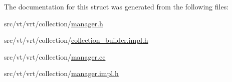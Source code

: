 The documentation for this struct was generated from the following files\+:\begin{DoxyCompactItemize}
\item 
src/vt/vrt/collection/\hyperlink{vrt_2collection_2manager_8h}{manager.\+h}\item 
src/vt/vrt/collection/\hyperlink{collection__builder_8impl_8h}{collection\+\_\+builder.\+impl.\+h}\item 
src/vt/vrt/collection/\hyperlink{vrt_2collection_2manager_8cc}{manager.\+cc}\item 
src/vt/vrt/collection/\hyperlink{vrt_2collection_2manager_8impl_8h}{manager.\+impl.\+h}\end{DoxyCompactItemize}
